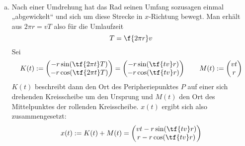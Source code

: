 \documentclass{mywork}
\begin{document}
	\begin{aufgabe}~

		\begin{enumerate}[a)]
			\item
				
		Nach einer Umdrehung hat das Rad seinen Umfang sozusagen einmal „abgewickelt“ und sich um diese Strecke in $x$-Richtung bewegt.
		Man erhält aus $2\pi r = v T$ also für die Umlaufzeit
		\[
			T = \f {2\pi r}v
		\]
		Sei
		\[
			K(t) := \begin{pmatrix}
				- r \sin (\tf {2\pi t}T) \\
				- r \cos (\tf {2\pi t}T) 
			\end{pmatrix}
			= \begin{pmatrix}
				- r \sin (\tf {tv}r) \\
				- r \cos (\tf {tv}r)
			\end{pmatrix}
			\qquad
			M(t) := \begin{pmatrix}
				v t \\
				r
			\end{pmatrix}
		\]
		$K(t)$ beschreibt dann den Ort des Peripheriepunktes $P$ auf einer sich drehenden Kreisscheibe um den Ursprung und $M(t)$ den Ort des Mittelpunktes der rollenden Kreisscheibe.
		$x(t)$ ergibt sich also zusammengesetzt:
		\[
			x(t) := K(t) + M(t) = \begin{pmatrix}
				vt - r \sin(\tf {tv}r) \\
				r - r \cos (\tf {tv}r)
			\end{pmatrix}
		\]


\end{enumerate}
\end{aufgabe}
\end{document}
